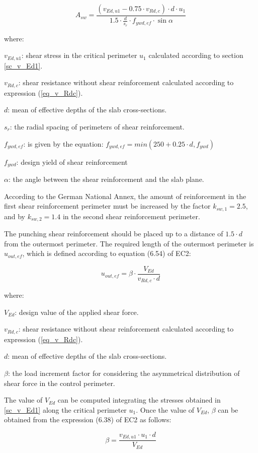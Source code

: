 \begin{equation}
  A_{sw}= \frac{(v_{Ed,u1} - 0.75 \cdot v_{Rd,c}) \cdot d \cdot u_1}{1.5 \cdot \frac{d}{s_r} \cdot f_{ywd, ef} \cdot \sin \alpha}
\end{equation}

\noindent where:

\begin{description}
\item{$v_{Ed,u1}$:} shear stress in the critical perimeter $u_1$ calculated according to section \ref{sc_v_Ed1}.
\item{$v_{Rd,c}$:} shear resistance without shear reinforcement calculated according to expression (\ref{eq_v_Rdc}).
\item{$d$:} mean of effective depths of the slab cross-sections.
\item{$s_r$:} the radial spacing of perimeters of shear reinforcement.
\item{$f_{ywd, ef}$:} is given by the equation: $f_{ywd, ef}= min(250 + 0.25 \cdot d, f_{ywd})$
\item{$f_{ywd}$: design yield of shear reinforcement}
\item{$\alpha$:} the angle between the shear reinforcement and the slab plane.
\end{description}

According to the German National Annex, the amount of reinforcement in the first shear reinforcement perimeter must be increased by the factor $k_{sw,1} = 2.5$, and by $k_{sw,2}= 1.4$ in the second shear reinforcement perimeter.

The punching shear reinforcement should be placed up to a distance of $1.5 \cdot d$ from the outermost perimeter. The required length of the outermost perimeter is $u_{out,ef}$, which is defined according to equation (6.54)  of EC2:

\begin{equation}
  u_{out,ef}= \beta \cdot \frac{V_{Ed}}{v_{Rd,c} \cdot d}
\end{equation}

\noindent where:

\begin{description}
\item{$V_{Ed}$:} design value of the applied shear force.
\item{$v_{Rd,c}$:} shear resistance without shear reinforcement calculated according to expression (\ref{eq_v_Rdc}).
\item{$d$:} mean of effective depths of the slab cross-sections.
\item{$\beta$:} the load increment factor for considering the asymmetrical distribution of shear force in the control perimeter.
\end{description}

The value of $V_{Ed}$ can be computed integrating the stresses obtained in \ref{sc_v_Ed1} along the critical perimeter $u_1$. Once the value of $V_{Ed}$, $\beta$ can be obtained from the expression (6.38) of EC2 as follows:

\begin{equation}
  \beta= \frac{v_{Ed,u1} \cdot u_1 \cdot d}{V_{Ed}}
\end{equation}
